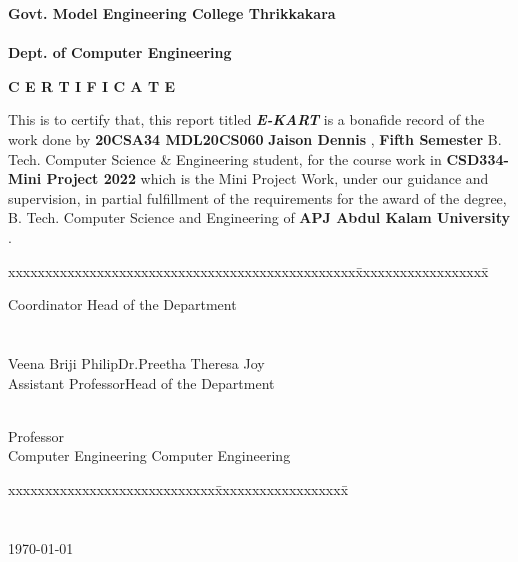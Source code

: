 \documentclass[11pt]{report}
\begin{document}
\begin{titlepage}
\begin{center}
\Large{\textbf{Govt. Model Engineering College Thrikkakara}}\\
\Large{\textbf{\\Dept. of Computer Engineering}}\\
\end{center}
\begin{figure}[h]
\begin{center}
\end{center}
\end{figure}
\begin{center}
\Large{\textbf{C E R T I F I C A T E}}\\
\vspace{.1in}
\end{center}
This is to certify that, this report titled \textbf{\textit {E-KART}} is a bonafide record of the work done by
{\textbf{20CSA34
MDL20CS060
}{\textbf{Jaison Dennis}}} {{, \textbf{Fifth Semester} B. Tech. Computer Science \& Engineering }}
student,  for the course work in \textbf{CSD334-Mini Project 2022} which is the Mini Project Work, under our guidance and supervision, in partial 
 fulfillment of the requirements for the award of the degree, B. Tech. Computer 
Science  and Engineering of \textbf{APJ Abdul Kalam University }.
\vspace{.1in}
\begin{tabbing}
xxxxxxxxxxxxxxxxxxxxxxxxxxxxxxxxxxxxxxxxxxxxxxx\= xxxxxxxxxxxxxxxxxx\= \kill

						Coordinator	\>Head of the Department
\\
\\
\\
  Veena Briji Philip\>Dr.Preetha Theresa Joy\\
	Assistant Professor\>Head of the Department
	
	 \\
	 \>Professor\\
Computer Engineering	\>	Computer Engineering
\end{tabbing}
\vspace{.08in}
%
\begin{tabbing}
xxxxxxxxxxxxxxxxxxxxxxxxxxxx\= xxxxxxxxxxxxxxxxxx\= \kill
			 \\
\\
\\
\today
\end{tabbing}
\end{titlepage}
\end{document}
